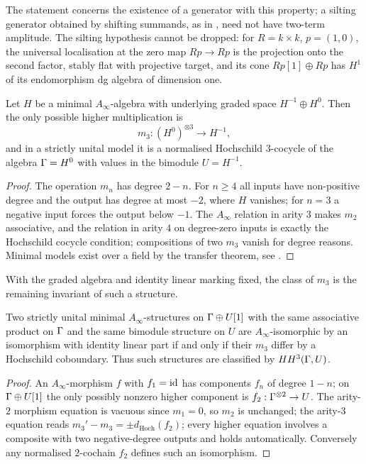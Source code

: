 The statement concerns the existence of a generator with this property; a silting generator obtained by shifting summands, as in , need not have two-term amplitude.  The silting hypothesis cannot be dropped: for \(R=k\times k\), \(p=(1,0)\), the universal localisation at the zero map \(Rp\to Rp\) is the projection onto the second factor, stably flat with projective target, and its cone \(Rp[1]\oplus Rp\) has \(H^1\) of its endomorphism dg algebra of dimension one.

\begin{proposition}\label{prop:higher-mult}
Let \(H\) be a minimal \(A_\infty\)-algebra with underlying graded space \(H^{-1}\oplus H^0\).  Then the only possible higher multiplication is
\[
 m_3:(H^0)^{\otimes3}\longrightarrow H^{-1},
\]
and in a strictly unital model it is a normalised Hochschild \(3\)-cocycle of the algebra \(\Gamma=H^0\) with values in the bimodule \(U=H^{-1}\).
\end{proposition}

\begin{proof}
The operation \(m_n\) has degree \(2-n\).  For \(n\ge4\) all inputs have non-positive degree and the output has degree at most \(-2\), where \(H\) vanishes; for \(n=3\) a negative input forces the output below \(-1\).  The \(A_\infty\) relation in arity \(3\) makes \(m_2\) associative, and the relation in arity \(4\) on degree-zero inputs is exactly the Hochschild cocycle condition; compositions of two \(m_3\) vanish for degree reasons.  Minimal models exist over a field by the transfer theorem, see \cite[Section~3.3]{Keller01Ainf}.
\end{proof}

With the graded algebra and identity linear marking fixed, the class of \(m_3\) is the remaining invariant of such a structure.

\begin{lemma}\label{lem:gauge}
Two strictly unital minimal \(A_\infty\)-structures on \(\Gamma\oplus U[1]\) with the same associative product on \(\Gamma\) and the same bimodule structure on \(U\) are \(A_\infty\)-isomorphic by an isomorphism with identity linear part if and only if their \(m_3\) differ by a Hochschild coboundary.  Thus such structures are classified by \(HH^3(\Gamma,U)\).
\end{lemma}

\begin{proof}
An \(A_\infty\)-morphism \(f\) with \(f_1=\operatorname{id}\) has components \(f_n\) of degree \(1-n\); on \(\Gamma\oplus U[1]\) the only possibly nonzero higher component is \(f_2:\Gamma^{\otimes2}\to U\).  The arity-\(2\) morphism equation is vacuous since \(m_1=0\), so \(m_2\) is unchanged; the arity-\(3\) equation reads \(m_3'-m_3=\pm d_{\mathrm{Hoch}}(f_2)\); every higher equation involves a composite with two negative-degree outputs and holds automatically.  Conversely any normalised \(2\)-cochain \(f_2\) defines such an isomorphism.
\end{proof}

